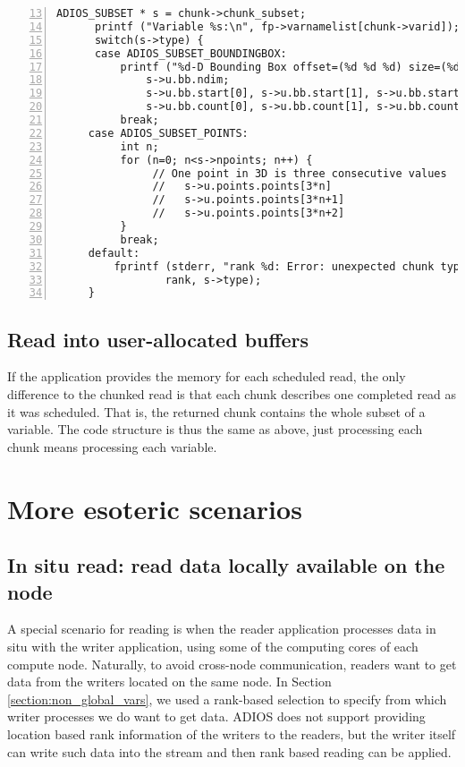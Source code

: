 \begin{lstlisting}[numbers=left, numberstyle=\color{gray}, stepnumber=2,firstnumber=13,
                             caption={Processing chunks from a file}, label=code:process_chunk]
      ADIOS_SUBSET * s = chunk->chunk_subset;
      printf ("Variable %s:\n", fp->varnamelist[chunk->varid]);
      switch(s->type) {
      case ADIOS_SUBSET_BOUNDINGBOX:
          printf ("%d-D Bounding Box offset=(%d %d %d) size=(%d %d %d)\n",
              s->u.bb.ndim;
              s->u.bb.start[0], s->u.bb.start[1], s->u.bb.start[2],
              s->u.bb.count[0], s->u.bb.count[1], s->u.bb.count[2]);
          break;
     case ADIOS_SUBSET_POINTS:
          int n;
          for (n=0; n<s->npoints; n++) {
               // One point in 3D is three consecutive values
               //   s->u.points.points[3*n]
               //   s->u.points.points[3*n+1]
               //   s->u.points.points[3*n+2]
          }
          break;
     default:
         fprintf (stderr, "rank %d: Error: unexpected chunk type: %d\n",
                 rank, s->type);
     }  
 \end{lstlisting}



\subsection{Read into user-allocated buffers}
If the application provides the memory for each scheduled read, the only difference 
to the chunked read is that each chunk describes one completed read as it was scheduled.
That is, the returned chunk contains the whole subset of a variable. The code structure 
is thus the same as above, just processing each chunk means processing each variable.


\section {More esoteric scenarios}


\subsection{In situ read: read data locally available on the node}
A special scenario for reading is when the reader application processes data in situ with the writer application, using some of the computing cores of each compute node. Naturally, to avoid cross-node communication, readers want to get data from the writers located on the same node. In Section \ref {section:non_global_vars}, we used a rank-based selection to specify from which writer processes we do want to get data. ADIOS does not support providing location based rank information of the writers to the readers, but the writer itself can write such data into the stream and then rank based reading can be applied. 

